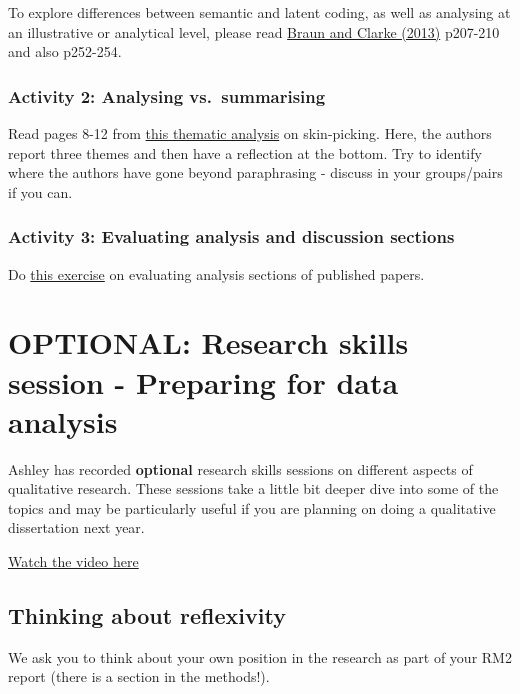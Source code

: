 \documentclass[
  english,
  letterpaper,
  DIV=11,
  numbers=noendperiod]{scrreprt}
\begin{document}
To explore differences between semantic and latent coding, as well as
analysing at an illustrative or analytical level, please read
\href{https://go.exlibris.link/wq9gqMKY}{Braun and Clarke (2013)}
p207-210 and also p252-254.

\subsubsection{Activity 2: Analysing
vs.~summarising}\label{activity-2-analysing-vs.-summarising}

Read pages 8-12 from
\href{https://study.sagepub.com/sites/default/files/anderson_clarke_reflective_commentary.pdf}{this
thematic analysis} on skin-picking. Here, the authors report three
themes and then have a reflection at the bottom. Try to identify where
the authors have gone beyond paraphrasing - discuss in your groups/pairs
if you can.

\subsubsection{Activity 3: Evaluating analysis and discussion
sections}\label{activity-3-evaluating-analysis-and-discussion-sections}

Do
\href{https://gla-my.sharepoint.com/:w:/g/personal/ashley_robertson_glasgow_ac_uk/EUiKwKgdqr1CsLeOxy5O42kBGNLxmbdeTqANFRu0caPcBA?e=BpEpBb}{this
exercise} on evaluating analysis sections of published papers.

\section{OPTIONAL: Research skills session - Preparing for data
analysis}\label{reflexivity_skills_session}

Ashley has recorded \textbf{optional} research skills sessions on
different aspects of qualitative research. These sessions take a little
bit deeper dive into some of the topics and may be particularly useful
if you are planning on doing a qualitative dissertation next year.

\href{https://echo360.org.uk/media/d4df06eb-4cf1-4ae0-bf8b-cf280d9da7e0/public}{Watch
the video here}

\subsection{Thinking about
reflexivity}\label{thinking-about-reflexivity}

We ask you to think about your own position in the research as part of
your RM2 report (there is a section in the methods!).
\end{document}

